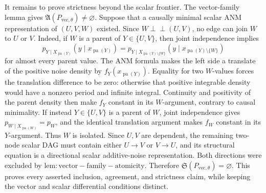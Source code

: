 It remains to prove strictness beyond the scalar frontier.  The vector-family lemma gives \(\mathfrak A(P_{\mathrm{vec},\theta})\neq\varnothing\).  Suppose that a causally minimal scalar ANM representation of \((U,V,W)\) existed.  Since \(W\perp\!\!\!\perp(U,V)\), no edge can join \(W\) to \(U\) or \(V\).  Indeed, if \(W\) is a parent of \(Y\in\{U,V\}\), then joint independence implies
\[
 p_{Y\mid X_{\operatorname{pa}(Y)}}(y\mid x_{\operatorname{pa}(Y)})
 =p_{Y\mid X_{\operatorname{pa}(Y)\setminus\{W\}}}(y\mid x_{\operatorname{pa}(Y)\setminus\{W\}})
\]
for almost every parent value.  The ANM formula makes the left side a translate of the positive noise density by \(f_Y(x_{\operatorname{pa}(Y)})\).  Equality for two \(W\)-values forces the translation difference to be zero: otherwise that positive integrable density would have a nonzero period and infinite integral.  Continuity and positivity of the parent density then make \(f_Y\) constant in its \(W\)-argument, contrary to causal minimality.  If instead \(Y\in\{U,V\}\) is a parent of \(W\), joint independence gives \(p_{W\mid X_{\operatorname{pa}(W)}}=p_W\), and the identical translation argument makes \(f_W\) constant in its \(Y\)-argument.  Thus \(W\) is isolated.  Since \(U,V\) are dependent, the remaining two-node scalar DAG must contain either \(U\to V\) or \(V\to U\), and its structural equation is a directional scalar additive-noise representation.  Both directions were excluded by \(\mathrm{lem:vector-family-atomicity}\).  Therefore \(\mathfrak S(P_{\mathrm{vec},\theta})=\varnothing\).  This proves every asserted inclusion, agreement, and strictness claim, while keeping the vector and scalar differential conditions distinct.